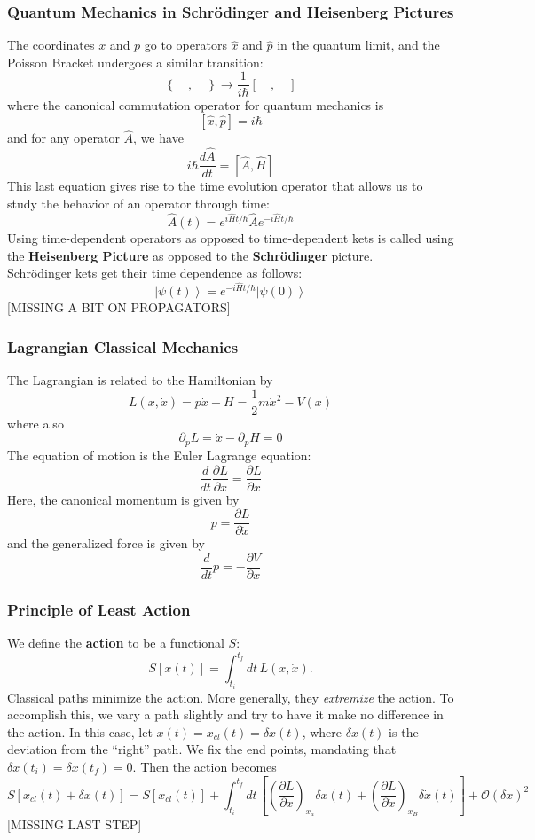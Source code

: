 \documentclass{article}
\begin{document}
	\subsubsection{Quantum Mechanics in Schr\"odinger and Heisenberg Pictures}
	The coordinates $x$ and $p$ go to operators $\hat{x}$ and $\hat{p}$ in the quantum limit, and the Poisson Bracket undergoes a similar transition:
	$$\left\{\quad,\quad\right\}\longrightarrow \frac{1}{i\hbar}\left[\quad,\quad\right]$$
	where the canonical commutation operator for quantum mechanics is
	$$\left[\hat{x},\hat{p}\right]=i\hbar$$
	and for any operator $\hat{A}$, we have
	$$i\hbar\frac{d\hat{A}}{dt}=\left[\hat{A},\hat{H}\right]$$
	This last equation gives rise to the time evolution operator that allows us to study the behavior of an operator through time:
	$$\hat{A}(t)=e^{i\hat{H}t/\hbar}\hat{A}e^{-i\hat{H}t/\hbar}$$
	Using time-dependent operators as opposed to time-dependent kets is called using the \textbf{Heisenberg Picture} as opposed to the \textbf{Schr\"odinger} picture.\\
	
	\noindent Schr\"odinger kets get their time dependence as follows:
	$$\left|\psi(t)\right>=e^{-i\hat{H}t/\hbar}\left|\psi(0)\right>$$
	[MISSING A BIT ON PROPAGATORS]
	\subsubsection{Lagrangian Classical Mechanics}
	The Lagrangian is related to the Hamiltonian by
	$$L(x,\dot{x})=p\dot{x}-H=\frac{1}{2}m\dot{x}^2-V(x)$$
	where also
	$$\partial_p L=\dot{x}-\partial_p H=0$$
	The equation of motion is the Euler Lagrange equation:
	\begin{equation}
	\label{ELEOM} \frac{d}{dt}\frac{\partial L}{\partial \dot{x}}=\frac{\partial L}{\partial x}
	\end{equation}
	Here, the canonical momentum is given by
	$$p=\frac{\partial L}{\partial \dot{x}}$$
	and the generalized force is given by
	$$\frac{d}{dt}p=-\frac{\partial V}{\partial x}$$
	\subsubsection{Principle of Least Action}
	We define the \textbf{action} to be a functional $S$:
	$$S[x(t)]=\int_{t_i}^{t_f}dt\,L(x,\dot{x}).$$
	Classical paths minimize the action. More generally, they \emph{extremize} the action. To accomplish this, we vary a path slightly and try to have it make no difference in the action. In this case, let $x(t)=x_{cl}(t)=\delta x(t)$, where $\delta x(t)$ is the deviation from the ``right'' path. We fix the end points, mandating that $\delta x(t_i)=\delta x(t_f)=0$. Then the action becomes
	$$S[x_{cl}(t)+\delta x(t)]=S[x_{cl}(t)]+\int_{t_i}^{t_f}dt\,\left[\left(\frac{\partial L}{\partial x}\right)_{x_a} \delta x(t)+\left(\frac{\partial L}{\partial \dot{x}}\right)_{x_B}\delta \dot{x}(t)\right]+\mathcal{O}(\delta x)^2$$
	[MISSING LAST STEP]
\end{document}
